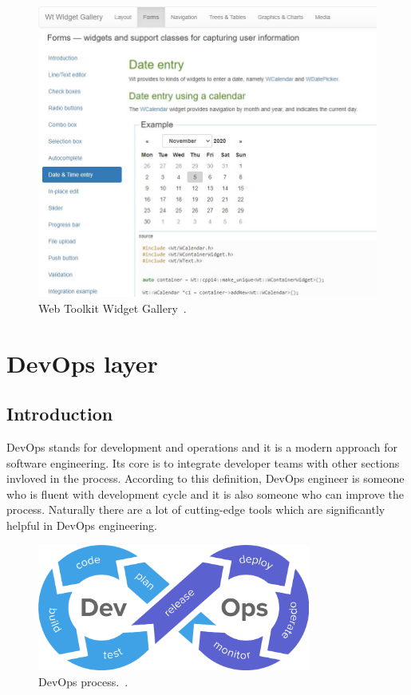 \documentclass[a4paper,12pt]{book}
\newcommand\tab[1][1cm]{\hspace*{#1}}
\begin{document}
{{\bigskip
\begin{figure}[h]
  \centering
    \includegraphics[width=1.0\textwidth]{gallery}
    \caption{Web Toolkit Widget Gallery~\cite{widgetsgallery}.}
    \label{fig:widgal}
\end{figure}
    
     
}

\chapter{DevOps layer}
\section{Introduction}
{
\tab DevOps stands for development and operations and it is a modern approach for software engineering. Its core is to integrate developer teams with other sections invloved in the process. According to this definition, DevOps engineer is someone who is fluent with development cycle and it is also someone who can improve the process. Naturally there are a lot of cutting-edge tools which are significantly helpful in DevOps engineering. 

\bigskip
\begin{figure}[H]
  \centering
    \includegraphics[width=0.8\textwidth]{devops}
    \caption{DevOps process.~\cite{devops}.}
    \label{fig:devopsflow}
\end{figure}
    
}}
\end{document}
